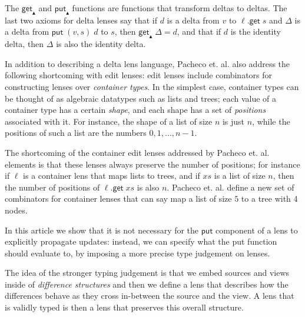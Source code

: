 \documentclass[acmsmall,review,anonymous]{acmart}\settopmatter{printfolios=true,printccs=false,printacmref=false}
\theoremstyle{definition}
\newcommand{\kw}[1]{\ensuremath{\mathsf{#1}}\xspace}
\newcommand{\get}{\ensuremath{\kw{get}}\xspace}
\newcommand{\pput}{\ensuremath{\kw{put}}\xspace}
\begin{document}
The $\get_{\blacktriangle}$ and $\pput_{\blacktriangle}$ functions are functions
that transform deltas to deltas. The last two axioms for delta lenses say that
if $d$ is a delta from $v$ to $\ell.\get \; s$ and $\Delta$ is a delta from
$\pput \; (v, s) \; d$ to $s$, then $\get_{\blacktriangle} \; \Delta = d$, and
that if $d$ is the identity delta, then $\Delta$ is also the identity delta.

In addition to describing a delta lens language, Pacheco et. al. also
address the following shortcoming with edit lenses: edit lenses include
combinators for constructing lenses over {\em container types}.
In the simplest case, container types can be thought of as algebraic datatypes
such as lists and trees; each value of a container type has a certain {\em
shape}, and each shape has a set of {\em positions} associated with it. For
instance, the shape of a list of size $n$ is just $n$, while the positions of
such a list are the numbers $0, 1, \ldots, n-1$.

The shortcoming of the container edit lenses addressed by Pacheco et. al.
elements is that these lenses always preserve the number of positions; for
instance if $\ell$ is a container lens that maps lists to trees, and if $xs$ is
a list of size $n$, then the number of positions of $\ell.\get \; xs$ is also
$n$. Pacheco et. al. define a new set of combinators for container lenses that
can say map a list of size $5$ to a tree with 4 nodes.

In this article we show that it is not necessary for the \pput component of a lens
to explicitly propagate updates: instead, we can specify what the put function should
evaluate to, by imposing a more precise type judgement on lenses.

The idea of the stronger typing judgement is that we embed sources and views inside
of {\em difference structures} and then we define a lens that describes how the
differences behave as they cross in-between the source and the view. A
lens that is validly typed is then a lens that preserves this overall structure.
\end{document}
